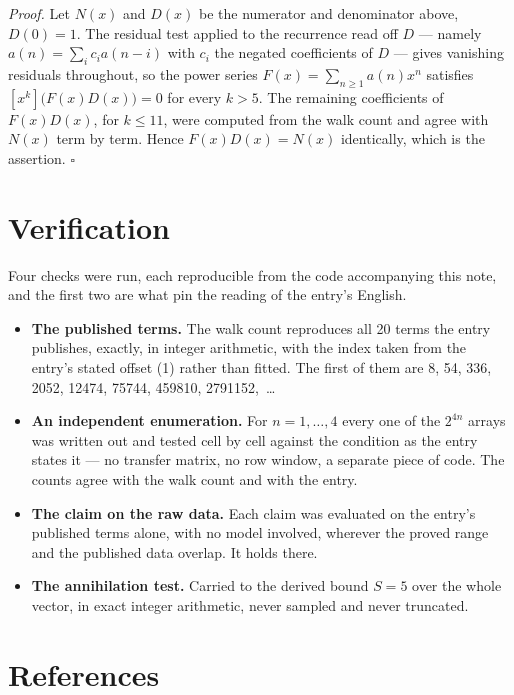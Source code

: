 \documentclass[11pt]{article}
\theoremstyle{definition}
\begin{document}
{\itshape Proof.} Let $N(x)$ and $D(x)$ be the numerator and denominator above, $D(0)=1$. The residual test applied to the recurrence read off $D$ --- namely $a(n) = \sum_i c_i a(n-i)$ with $c_i$ the negated coefficients of $D$ --- gives vanishing residuals throughout, so the power series $F(x)=\sum_{n\ge 1}a(n)x^n$ satisfies $[x^k]\bigl(F(x)D(x)\bigr) = 0$ for every $k > 5$. The remaining coefficients of $F(x)D(x)$, for $k \le 11$, were computed from the walk count and agree with $N(x)$ term by term. Hence $F(x)D(x) = N(x)$ identically, which is the assertion. $\square$

\section{Verification}

Four checks were run, each reproducible from the code accompanying this note, and the first two are what pin the reading of the entry's English.

\begin{itemize}

\item {\bfseries The published terms.} The walk count reproduces all 20 terms the entry publishes, exactly, in integer arithmetic, with the index taken from the entry's stated offset (1) rather than fitted. The first of them are 8, 54, 336, 2052, 12474, 75744, 459810, 2791152,~\dots

\item {\bfseries An independent enumeration.} For $n = 1,\dots,4$ every one of the $2^{4n}$ arrays was written out and tested cell by cell against the condition as the entry states it --- no transfer matrix, no row window, a separate piece of code. The counts agree with the walk count and with the entry.

\item {\bfseries The claim on the raw data.} Each claim was evaluated on the entry's published terms alone, with no model involved, wherever the proved range and the published data overlap. It holds there.

\item {\bfseries The annihilation test.} Carried to the derived bound $S = 5$ over the whole vector, in exact integer arithmetic, never sampled and never truncated.

\end{itemize}

\section{References}
\end{document}
